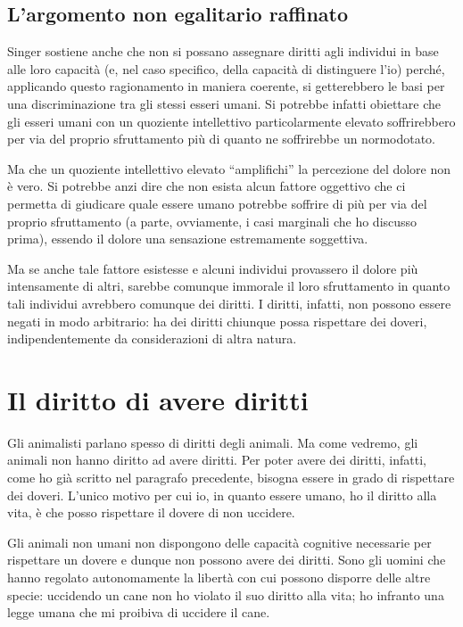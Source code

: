 \documentclass[a4paper,11pt,oneside,article]{memoir}
\begin{document}
\section{L'argomento non egalitario raffinato}

Singer sostiene anche che non si possano assegnare diritti agli individui in
base alle loro capacità (e, nel caso specifico, della capacità di distinguere
l'io) perché, applicando questo ragionamento in maniera coerente, si
getterebbero le basi per una discriminazione tra gli stessi esseri umani. Si
potrebbe infatti obiettare che gli esseri umani con un quoziente intellettivo
particolarmente elevato soffrirebbero per via del proprio sfruttamento più di
quanto ne soffrirebbe un normodotato.

Ma che un quoziente intellettivo elevato ``amplifichi'' la percezione del dolore
non è vero. Si potrebbe anzi dire che non esista alcun fattore oggettivo che ci
permetta di giudicare quale essere umano potrebbe soffrire di più per via del
proprio sfruttamento (a parte, ovviamente, i casi marginali che ho discusso
prima), essendo il dolore una sensazione estremamente soggettiva.

Ma se anche tale fattore esistesse e alcuni individui provassero il dolore più
intensamente di altri, sarebbe comunque immorale il loro sfruttamento in quanto
tali individui avrebbero comunque dei diritti. I diritti, infatti, non possono
essere negati in modo arbitrario: ha dei diritti chiunque possa rispettare dei
doveri, indipendentemente da considerazioni di altra natura.

\chapter{Il diritto di avere diritti}

Gli animalisti parlano spesso di diritti degli animali. Ma come vedremo, gli
animali non hanno diritto ad avere diritti. Per poter avere dei diritti,
infatti, come ho già scritto nel paragrafo precedente, bisogna essere in grado
di rispettare dei doveri. L'unico motivo per cui io, in quanto essere umano, ho
il diritto alla vita, è che posso rispettare il dovere di non uccidere.

Gli animali non umani non dispongono delle capacità cognitive necessarie per
rispettare un dovere e dunque non possono avere dei diritti. Sono gli uomini che
hanno regolato autonomamente la libertà con cui possono disporre delle altre
specie: uccidendo un cane non ho violato il suo diritto alla vita; ho infranto
una legge umana che mi proibiva di uccidere il cane.
\end{document}

